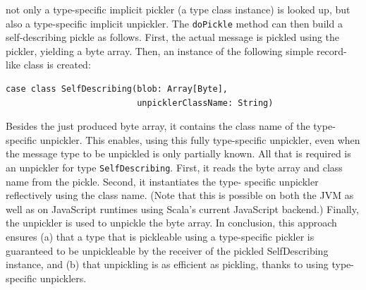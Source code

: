 \documentclass{jfp1}
\begin{document}
\noindent not only a type-specific implicit pickler (a type class instance) is
looked up, but also a type-specific implicit unpickler. The \verb|doPickle|
method can then build a self-describing pickle as follows. First, the actual
message is pickled using the pickler, yielding a byte array. Then, an instance
of the following simple record-like class is created:

\begin{lstlisting}
case class SelfDescribing(blob: Array[Byte],
                          unpicklerClassName: String)
\end{lstlisting}

Besides the just produced byte array, it contains the class name of the type-
specific unpickler. This enables, using this fully type-specific unpickler, even
when the message type to be unpickled is only partially known. All that is
required is an unpickler for type \verb|SelfDescribing|. First, it reads the
byte array and class name from the pickle. Second, it instantiates the type-
specific unpickler reflectively using the class name. (Note that this is
possible on both the JVM as well as on JavaScript runtimes using Scala's current
JavaScript backend.) Finally, the unpickler is used to unpickle the byte array.
In conclusion, this approach ensures (a) that a type that is pickleable using a
type-specific pickler is guaranteed to be unpickleable by the receiver of the
pickled SelfDescribing instance, and (b) that unpickling is as efficient as
pickling, thanks to using type-specific unpicklers.


%
%
\end{document}
